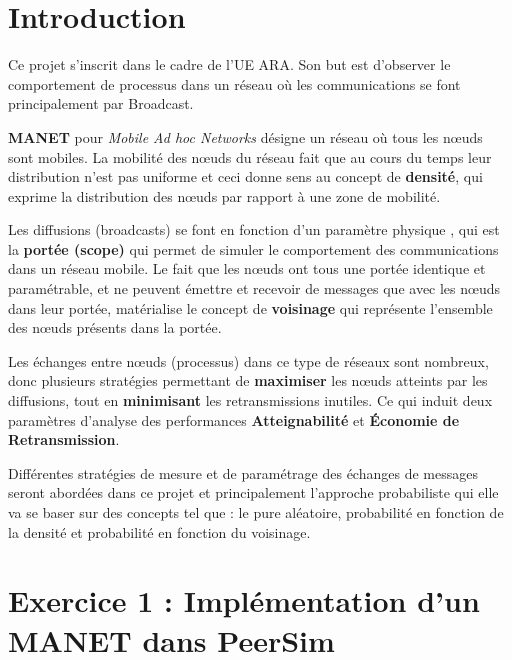 \documentclass[10pt]{report}
\begin{document}
\tableofcontents
\newpage
\sectionfont{\scshape}
\section{Introduction}
Ce projet s'inscrit dans le cadre de l'UE ARA. Son but est d'observer le comportement de processus dans un réseau où les communications se font principalement par Broadcast.

\textbf{MANET} pour \textit{Mobile Ad hoc Networks} désigne un réseau où tous les nœuds sont mobiles.
La mobilité des nœuds du réseau fait que au cours du temps leur distribution n'est pas uniforme et ceci donne sens au concept de \textbf{densité}, qui exprime la distribution des nœuds par rapport à une zone de mobilité.

Les diffusions (broadcasts) se font en fonction d'un paramètre physique , qui est la \textbf{portée (scope)} qui permet de simuler le comportement des communications dans un réseau mobile.
Le fait que les nœuds ont tous une portée identique et paramétrable, et ne peuvent émettre et recevoir de messages que avec les nœuds dans leur portée, matérialise le concept de \textbf{voisinage} qui représente l'ensemble des nœuds présents dans la portée. 

Les échanges entre nœuds (processus) dans ce type de réseaux sont nombreux, donc plusieurs stratégies permettant de \textbf{maximiser} les nœuds atteints par les diffusions, tout en \textbf{minimisant} les retransmissions inutiles. Ce qui induit deux paramètres d'analyse des performances \textbf{Atteignabilité} et \textbf{Économie de Retransmission}.

Différentes stratégies de mesure et de paramétrage des échanges de messages seront abordées dans ce projet et principalement l'approche probabiliste qui elle va se baser sur des concepts tel que : le pure aléatoire, probabilité en fonction de la densité et probabilité en fonction du voisinage.

\newpage

\section{Exercice 1 : Implémentation d'un MANET dans PeerSim}
\end{document}
